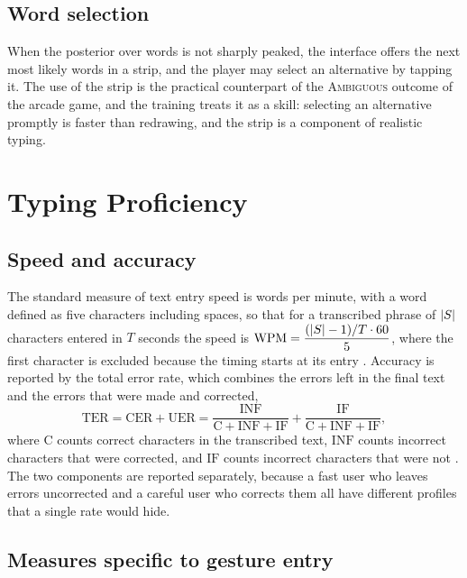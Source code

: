 \section{Word selection}

When the posterior over words is not sharply peaked, the interface offers the next most likely words in a strip, and the player may select an alternative by tapping it. The use of the strip is the practical counterpart of the \textsc{Ambiguous} outcome of the arcade game, and the training treats it as a skill: selecting an alternative promptly is faster than redrawing, and the strip is a component of realistic typing.

\chapter{Typing Proficiency}\label{ch:typing-proficiency}

\section{Speed and accuracy}

The standard measure of text entry speed is words per minute, with a word defined as five characters including spaces, so that for a transcribed phrase of $\lvert S\rvert$ characters entered in $T$ seconds the speed is $\mathrm{WPM}=\dfrac{(\lvert S\rvert-1)/T\cdot 60}{5}$, where the first character is excluded because the timing starts at its entry \cite{soukoreff2003}.\evD{} Accuracy is reported by the total error rate, which combines the errors left in the final text and the errors that were made and corrected,
\[
\mathrm{TER}=\mathrm{CER}+\mathrm{UER}=\frac{\mathrm{INF}}{\mathrm{C}+\mathrm{INF}+\mathrm{IF}}+\frac{\mathrm{IF}}{\mathrm{C}+\mathrm{INF}+\mathrm{IF}},
\]
where $\mathrm{C}$ counts correct characters in the transcribed text, $\mathrm{INF}$ counts incorrect characters that were corrected, and $\mathrm{IF}$ counts incorrect characters that were not \cite{soukoreff2003}.\evD{} The two components are reported separately, because a fast user who leaves errors uncorrected and a careful user who corrects them all have different profiles that a single rate would hide.

\section{Measures specific to gesture entry}

